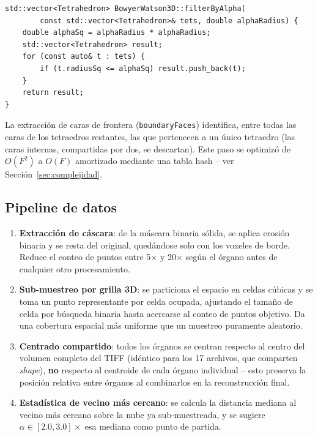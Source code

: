 \documentclass[12pt,a4paper]{article}
\begin{document}
\begin{lstlisting}[caption={Filtrado alpha-shape sobre la triangulación completa}]
std::vector<Tetrahedron> BowyerWatson3D::filterByAlpha(
        const std::vector<Tetrahedron>& tets, double alphaRadius) {
    double alphaSq = alphaRadius * alphaRadius;
    std::vector<Tetrahedron> result;
    for (const auto& t : tets) {
        if (t.radiusSq <= alphaSq) result.push_back(t);
    }
    return result;
}
\end{lstlisting}

La extracción de caras de frontera (\texttt{boundaryFaces}) identifica,
entre todas las caras de los tetraedros restantes, las que pertenecen a
un único tetraedro (las caras internas, compartidas por dos, se
descartan). Este paso se optimizó de $O(F^2)$ a $O(F)$ amortizado
mediante una tabla hash -- ver Sección~\ref{sec:complejidad}.

\subsection{Pipeline de datos}

\begin{enumerate}
    \item \textbf{Extracción de cáscara}: de la máscara binaria sólida,
    se aplica erosión binaria y se resta del original, quedándose solo
    con los voxeles de borde. Reduce el conteo de puntos entre 5$\times$
    y 20$\times$ según el órgano antes de cualquier otro procesamiento.
    \item \textbf{Sub-muestreo por grilla 3D}: se particiona el espacio
    en celdas cúbicas y se toma un punto representante por celda
    ocupada, ajustando el tamaño de celda por búsqueda binaria hasta
    acercarse al conteo de puntos objetivo. Da una cobertura espacial
    más uniforme que un muestreo puramente aleatorio.
    \item \textbf{Centrado compartido}: todos los órganos se centran
    respecto al centro del volumen completo del TIFF (idéntico para los
    17 archivos, que comparten \emph{shape}), \textbf{no} respecto al
    centroide de cada órgano individual -- esto preserva la posición
    relativa entre órganos al combinarlos en la reconstrucción final.
    \item \textbf{Estadística de vecino más cercano}: se calcula la
    distancia mediana al vecino más cercano sobre la nube ya
    sub-muestreada, y se sugiere $\alpha \in [2.0, 3.0] \times$ esa
    mediana como punto de partida.
\end{enumerate}
\end{document}
